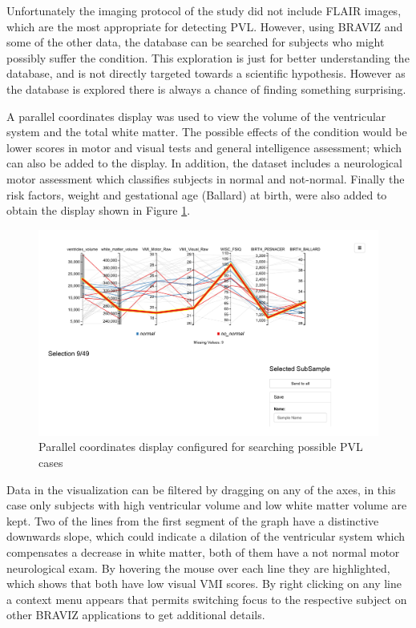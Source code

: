 \documentclass[twocolumn]{svjour3}
\begin{document}
Unfortunately the imaging protocol of the study did not include FLAIR images, which are the most appropriate for detecting PVL. However, using BRAVIZ and some of the other data, the database can be searched for subjects who might possibly suffer the condition. This exploration is just for better understanding the database, and is not directly targeted towards a scientific hypothesis. However as the database is explored there is always a chance of finding something surprising.

A parallel coordinates display was used to view the volume of the ventricular system and the total white matter. The possible effects of the condition would be lower scores in motor and visual tests and general intelligence assessment; which can also be added to the display. In addition, the dataset includes a neurological motor assessment which classifies subjects in normal and not-normal.  Finally the risk factors, weight and gestational age (Ballard) at birth, were also added to obtain the display shown in Figure \ref{fig_parallel}.

\begin{figure}
\begin{center}
\includegraphics[width=\linewidth,trim = 30mm 90mm 60mm 10mm ,clip]{parallel_coordinates_raw}
\end{center}
 \caption{\label{fig_parallel}Parallel coordinates display configured for searching possible PVL cases}
\end{figure}

Data in the visualization can be filtered by dragging on any of the axes, in this case only subjects with high ventricular volume and low white matter volume are kept. Two of the lines from the first segment of the graph have a distinctive downwards slope, which could indicate a dilation of the ventricular system which compensates a decrease in white matter, both of them have a not normal motor neurological exam. By hovering the mouse over each line they are highlighted, which shows that both have low visual VMI scores. By right clicking on any line a context menu appears that permits switching focus to the respective subject on other BRAVIZ applications to get additional details. 
\end{document}
